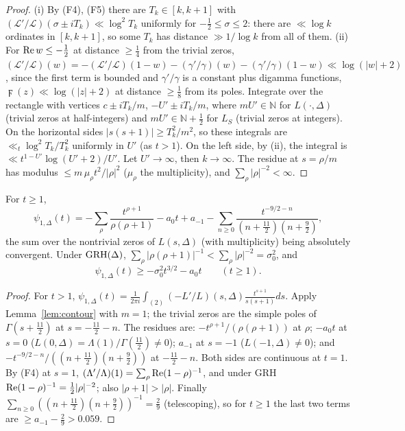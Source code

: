 \begin{proof}
(i) By (F4), (F5) there are $T_k\in[k,k+1]$ with $(\mathcal L'/\mathcal L)(\sigma\pm iT_k)\ll\log^2T_k$ uniformly for $-\frac12\le\sigma\le2$: there are $\ll\log k$ ordinates in $[k,k+1]$, so some $T_k$ has distance $\gg1/\log k$ from all of them. (ii) For $\operatorname{Re} w\le-\frac12$ at distance $\ge\frac14$ from the trivial zeros, $(\mathcal L'/\mathcal L)(w)=-(\mathcal L'/\mathcal L)(1-w)-(\gamma'/\gamma)(w)-(\gamma'/\gamma)(1-w)\ll\log(|w|+2)$, since the first term is bounded and $\gamma'/\gamma$ is a constant plus digamma functions, $\digamma(z)\ll\log(|z|+2)$ at distance $\ge\frac18$ from its poles. Integrate over the rectangle with vertices $c\pm iT_k/m$, $-U'\pm iT_k/m$, where $mU'\in\mathbb N$ for $L(\cdot,\Delta)$ (trivial zeros at half-integers) and $mU'\in\mathbb N+\frac12$ for $L_S$ (trivial zeros at integers). On the horizontal sides $|s(s+1)|\ge T_k^2/m^2$, so these integrals are $\ll_t\log^2T_k/T_k^2$ uniformly in $U'$ (as $t>1$). On the left side, by (ii), the integral is $\ll t^{1-U'}\log(U'+2)/U'$. Let $U'\to\infty$, then $k\to\infty$. The residue at $s=\rho/m$ has modulus $\le m\,\mu_\rho t^2/|\rho|^2$ ($\mu_\rho$ the multiplicity), and $\sum_\rho|\rho|^{-2}<\infty$.
\end{proof}

\begin{lemma}\label{lem:psi1}
For $t\ge1$,
\[
\psi_{1,\Delta}(t)=-\sum_\rho\frac{t^{\rho+1}}{\rho(\rho+1)}-a_0t+a_{-1}-\sum_{n\ge0}\frac{t^{-9/2-n}}{(n+\frac{11}2)(n+\frac92)},
\]
the sum over the nontrivial zeros of $L(s,\Delta)$ (with multiplicity) being absolutely convergent. Under $\mathrm{GRH}(\Delta)$, $\sum_\rho|\rho(\rho+1)|^{-1}<\sum_\rho|\rho|^{-2}=\sigma_0^2$, and
\begin{equation}\label{eq:psi1bound}
\psi_{1,\Delta}(t)\ge-\sigma_0^2t^{3/2}-a_0t\qquad(t\ge1).
\end{equation}
\end{lemma}

\begin{proof}
For $t>1$, $\psi_{1,\Delta}(t)=\frac1{2\pi i}\int_{(2)}(-L'/L)(s,\Delta)\frac{t^{s+1}}{s(s+1)}ds$. Apply Lemma~\ref{lem:contour} with $m=1$; the trivial zeros are the simple poles of $\Gamma(s+\frac{11}2)$ at $s=-\frac{11}2-n$. The residues are: $-t^{\rho+1}/(\rho(\rho+1))$ at $\rho$; $-a_0t$ at $s=0$ ($L(0,\Delta)=\Lambda(1)/\Gamma(\frac{11}2)\ne0$); $a_{-1}$ at $s=-1$ ($L(-1,\Delta)\ne0$); and $-t^{-9/2-n}/((n+\frac{11}2)(n+\frac92))$ at $-\frac{11}2-n$. Both sides are continuous at $t=1$. By (F4) at $s=1$, $(\Lambda'/\Lambda)(1)=\sum_\rho\operatorname{Re}(1-\rho)^{-1}$, and under GRH $\operatorname{Re}(1-\rho)^{-1}=\frac12|\rho|^{-2}$; also $|\rho+1|>|\rho|$. Finally $\sum_{n\ge0}((n+\frac{11}2)(n+\frac92))^{-1}=\frac29$ (telescoping), so for $t\ge1$ the last two terms are $\ge a_{-1}-\frac29>0.059$.
\end{proof}

